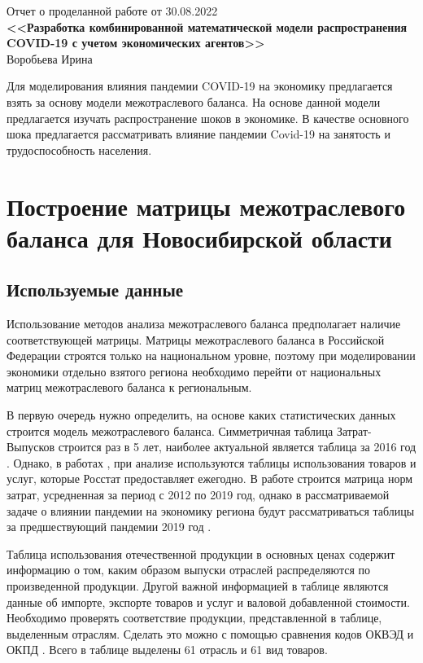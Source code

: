 \documentclass[12pt, a4paper]{article}
\begin{document}
\begin{center}
Отчет о проделанной работе от 30.08.2022\\

\textbf{<<Разработка комбинированной математической модели распространения COVID-19 с учетом экономических агентов>>}\\
Воробьева Ирина
\end{center}

Для моделирования влияния пандемии COVID-19 на экономику предлагается взять за основу модели межотраслевого баланса. На основе данной модели предлагается изучать распространение шоков в экономике. В качестве основного шока предлагается рассматривать влияние пандемии Covid-19 на занятость и трудоспособность населения.

\section{Построение матрицы межотраслевого баланса для Новосибирской области}
\subsection{Используемые данные}
Использование методов анализа межотраслевого баланса предполагает наличие соответствующей матрицы. Матрицы межотраслевого баланса в Российской Федерации строятся только на национальном уровне, поэтому при моделировании экономики отдельно взятого региона необходимо перейти от национальных матриц межотраслевого баланса к региональным.

В первую очередь нужно определить, на основе каких статистических данных строится модель межотраслевого баланса. Симметричная таблица Затрат-Выпусков строится раз в 5 лет, наиболее актуальной является таблица за 2016 год \cite{RosstatZV}. Однако, в работах \cite{AkimovaCourse}, \cite{MOBLoc} при анализе используются таблицы использования товаров и услуг, которые Росстат предоставляет ежегодно. В работе \cite{AkimovaCourse} строится матрица норм затрат, усредненная за период с 2012 по 2019 год, однако в рассматриваемой задаче о влиянии пандемии на экономику региона будут рассматриваться таблицы за предшествующий пандемии 2019 год  \cite{RosstatTRI}.

Таблица использования отечественной продукции в основных ценах содержит информацию о том, каким образом выпуски отраслей распределяются по произведенной продукции. Другой важной информацией в таблице являются данные об импорте, экспорте товаров и услуг и валовой добавленной стоимости. Необходимо проверять соответствие продукции, представленной в таблице, выделенным отраслям. Сделать это можно с помощью сравнения кодов ОКВЭД и ОКПД \cite{OKPD}.
 Всего в таблице выделены 61 отрасль и 61 вид товаров.
\end{document}
